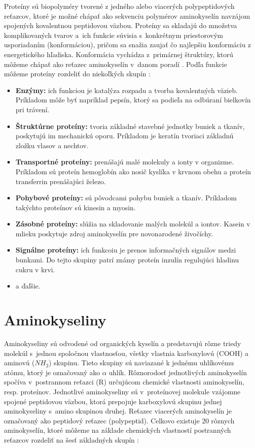 Proteíny sú biopolyméry tvorené z jedného alebo viacerých polypeptidových reťazcov, ktoré je možné chápať ako sekvenciu polymérov aminokyselín navzájom spojených kovalentnou peptidovou väzbou. Proteíny sa skladajú do množstva komplikovaných tvarov a~ich funkcie súvisia s~konkrétnym priestorovým usporiadaním (konformáciou), pričom sa snažia zaujať čo najlepšiu konformáciu z energetického hľadiska. Konformácia vychádza z~primárnej štruktúry, ktorú môžeme chápať ako reťazec aminokyselín v~danom poradí \cite{proteiny}. Podľa funkcie môžeme proteíny rozdeliť do niekoľkých skupín \cite{proteiny}:  
\begin{itemize}
	\item \textbf{Enzýmy:} ich funkciou je katalýza rozpadu a tvorba kovalentných väzieb. Príkladom môže byť napríklad pepsín, ktorý sa podieľa na odbúraní bielkovín pri trávení.
	\item \textbf{Štruktúrne proteíny:} tvoria základné stavebné jednotky buniek a tkanív, poskytujú im mechanickú oporu. Príkladom je keratín tvoriaci základnú zložku vlasov a nechtov.
	\item \textbf{Transportné proteíny:} prenášajú malé molekuly a ionty v organizme. Príkladom sú proteín hemoglobín ako nosič kyslíka v krvnom obehu a proteín transferrin prenášajúci železo.
	\item \textbf{Pohybové proteíny:} sú pôvodcami pohybu buniek a tkanív. Príkladom takýchto proteínov sú kinesin a myosin.
	\item \textbf{Zásobné proteíny:} slúžia na skladovanie malých molekúl a iontov. Kasein v mlieku poskytuje zdroj aminokyselín pre novonarodené živočíchy. 
	\item \textbf{Signálne proteíny:} ich funkcoiu je prenos informačných signálov medzi bunkami. Do tejto skupiny patrí známy proteín inzulín regulujúci hladinu cukru v krvi.
	\item a ďaľšie.
\end{itemize}

\section{Aminokyseliny}
Aminokyseliny sú odvodené od organických kyselín a predstavujú rôzne triedy molekúl s~jednou spoločnou vlastnosťou, všetky vlastnia karboxylovú (COOH) a aminovú ($NH_{2}$) skupinu. Tieto skupiny sú naviazané k jednému uhlíkovému atómu, ktorý je označovaný ako $\alpha$ uhlík. Rôznorodosť jednotlivých aminokyselín spočíva v~postrannom reťazci (R) určujúcom chemické vlastnosti aminokyselín, resp. proteínov. Jednotlivé aminokyseliny sú v~proteínovej molekule vzájomne spojené peptidovou väzbou, ktorá prepojuje karboxylovú skupinu jednej aminokyseliny s~amino skupinou druhej. Reťazec viacerých aminokyselín je označovaný ako peptidový reťazec (polypeptid). 
Celkovo existuje 20 rôznych aminokyselín, ktoré môžeme na základe chemických vlastností postranných reťazcov rozdeliť na šesť základných skupín \cite{aminokyseliny}:

